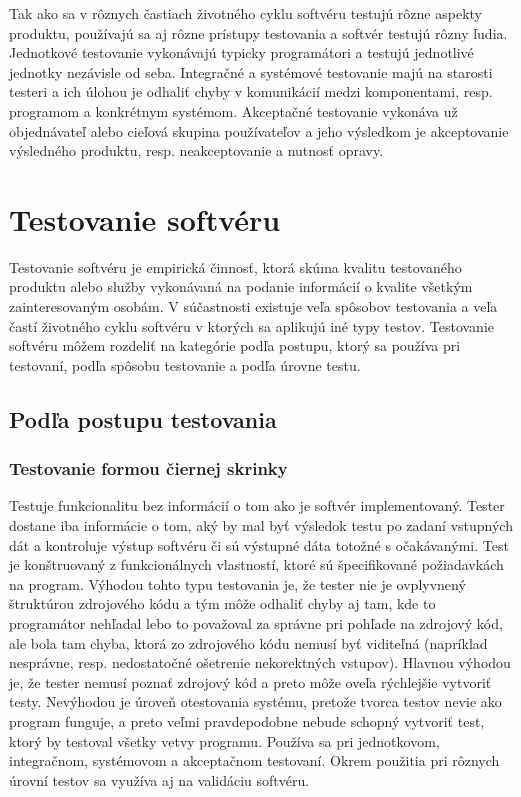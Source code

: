 \documentclass[11pt,twoside,slovak,a4paper]{article}
\begin{document}
	Tak ako sa v rôznych častiach životného cyklu softvéru testujú rôzne aspekty produktu, používajú sa aj rôzne prístupy testovania a softvér testujú rôzny ľudia. Jednotkové testovanie vykonávajú typicky programátori a testujú jednotlivé jednotky nezávisle od seba. Integračné a systémové testovanie majú na starosti testeri a ich úlohou je odhaliť chyby v komunikácií medzi komponentami, resp. programom a konkrétnym systémom. Akceptačné testovanie vykonáva už objednávateľ alebo cieľová skupina používateľov a jeho výsledkom je akceptovanie výsledného produktu, resp. neakceptovanie a nutnosť opravy.
	
	
	
	\section{Testovanie softvéru}
	Testovanie softvéru je empirická činnosť, ktorá skúma kvalitu testovaného produktu alebo služby vykonávaná na podanie informácií o kvalite všetkým zainteresovaným osobám\cite{Kaner2006}. V súčastnosti existuje veľa spôsobov testovania a veľa častí životného cyklu softvéru v ktorých sa aplikujú iné typy testov. Testovanie softvéru môžem rozdeliť na kategórie podľa postupu, ktorý sa používa pri testovaní, podľa spôsobu testovanie a podľa úrovne testu.
	
	\subsection{Podľa postupu testovania}
		\subsubsection{Testovanie formou čiernej skrinky} 
			Testuje funkcionalitu bez informácií o tom ako je softvér implementovaný. Tester dostane iba informácie o tom, aký by mal byť výsledok testu po zadaní vstupných dát a kontroluje výstup softvéru či sú výstupné dáta totožné s očakávanými\cite{EST2002}. Test je konštruovaný z funkcionálnych vlastností, ktoré sú špecifikované požiadavkách na program\cite{Moha1991}.  Výhodou tohto typu testovania je, že tester nie je ovplyvnený štruktúrou zdrojového kódu a tým môže odhaliť chyby aj tam, kde to programátor nehľadal lebo to považoval za správne pri pohľade na zdrojový kód, ale bola tam chyba, ktorá zo zdrojového kódu nemusí byť viditeľná (napríklad nesprávne, resp. nedostatočné ošetrenie nekorektných vstupov). Hlavnou výhodou je, že tester nemusí poznať zdrojový kód a preto môže oveľa rýchlejšie vytvoriť testy. Nevýhodou je úroveň otestovania systému, pretože tvorca testov nevie ako program funguje, a preto veľmi pravdepodobne nebude schopný vytvoriť test, ktorý by testoval všetky vetvy programu. Používa sa pri jednotkovom, integračnom, systémovom a akceptačnom testovaní. Okrem použitia pri rôznych úrovní testov sa využíva aj na validáciu softvéru\cite{EST2002}.
\end{document}
